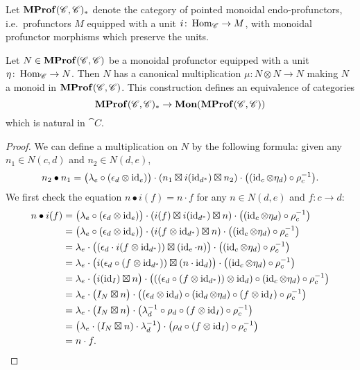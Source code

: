 \documentclass[12pt,oneside,article,draft]{memoir}
\begin{document}
Let $\mathbf{MProf}(\mathscr{C},\mathscr{C})_*$ denote the category of pointed monoidal endo-profunctors, i.e.~profunctors $M$ equipped with a unit $i\colon\operatorname{Hom}_{\mathscr{C}}\to M$, with monoidal profunctor morphisms which preserve the units.


\begin{proposition}\label{Prop:unit implies monoid}
	Let $N\in\mathbf{MProf}(\mathscr{C},\mathscr{C})$ be a monoidal profunctor equipped with a unit $\eta\colon\operatorname{Hom}_{\mathscr{C}}\to N$. Then $N$ has a canonical multiplication $\mu\colon N\otimes N\to N$ making $N$ a monoid in $\mathbf{MProf}(\mathscr{C},\mathscr{C})$. This construction defines an equivalence of categories
	\[\mathbf{MProf}(\mathscr{C},\mathscr{C})_*\to\mathbf{Mon}(\mathbf{MProf}(\mathscr{C},\mathscr{C}))\]
	which is natural in $\cat{C}$.
\end{proposition}
\begin{proof}
	We can define a multiplication on $N$ by the following formula: given any $n_1\in N(c,d)$ and $n_2\in N(d,e)$,
	\[
		n_2\bullet n_1 = \bigl(\lambda_e\circ(\epsilon_d\otimes\operatorname{id}_e)\bigr)\cdot(n_1\boxtimes i(\operatorname{id}_{d^*})\boxtimes n_2)\cdot\bigl((\operatorname{id}_c\otimes \eta_d)\circ\rho_c^{-1}\bigr).
	\]
	We first check the equation $n\bullet i(f)=n\cdot f$ for any $n\in N(d,e)$ and $f\colon c\to d$:
	\begin{align*}
		n\bullet i(f) &= \bigl(\lambda_e\circ(\epsilon_d\otimes\operatorname{id}_e)\bigr)\cdot(i(f)\boxtimes i(\operatorname{id}_{d^*})\boxtimes n)\cdot\bigl((\operatorname{id}_c\otimes \eta_d)\circ\rho_c^{-1}\bigr) \\
		&= \bigl(\lambda_e\circ(\epsilon_d\otimes\operatorname{id}_e)\bigr)\cdot(i(f\otimes\operatorname{id}_{d^*})\boxtimes n)\cdot\bigl((\operatorname{id}_c\otimes \eta_d)\circ\rho_c^{-1}\bigr) \\
		&= \lambda_e\cdot\bigl((\epsilon_d\cdot i(f\otimes \operatorname{id}_{d^*}))\boxtimes (\operatorname{id}_e\cdot n)\bigr)\cdot\bigl((\operatorname{id}_c\otimes \eta_d)\circ\rho_c^{-1}\bigr) \\
		&= \lambda_e\cdot\bigl(i(\epsilon_d\circ (f\otimes \operatorname{id}_{d^*}))\boxtimes (n\cdot\operatorname{id}_d)\bigr)\cdot\bigl((\operatorname{id}_c\otimes \eta_d)\circ\rho_c^{-1}\bigr) \\
		&= \lambda_e\cdot\bigl(i(\operatorname{id}_I)\boxtimes n\bigr)\cdot\bigl(((\epsilon_d\circ (f\otimes \operatorname{id}_{d^*}))\otimes\operatorname{id}_d)\circ(\operatorname{id}_c\otimes \eta_d)\circ\rho_c^{-1}\bigr) \\
		&= \lambda_e\cdot\bigl(I_N\boxtimes n\bigr)\cdot\bigl((\epsilon_d\otimes\operatorname{id}_d)\circ(\operatorname{id}_d\otimes\eta_d)\circ(f\otimes\operatorname{id}_I)\circ\rho_c^{-1}\bigr) \\
		&= \lambda_e\cdot\bigl(I_N\boxtimes n\bigr)\cdot\bigl(\lambda_d^{-1}\circ\rho_d\circ(f\otimes\operatorname{id}_I)\circ\rho_c^{-1}\bigr) \\
		&= \bigl(\lambda_e\cdot(I_N\boxtimes n)\cdot\lambda_d^{-1}\bigr)\cdot\bigl(\rho_d\circ(f\otimes\operatorname{id}_I)\circ\rho_c^{-1}\bigr) \\
		&= n\cdot f.
	\end{align*}


\end{proof}
\end{document}
